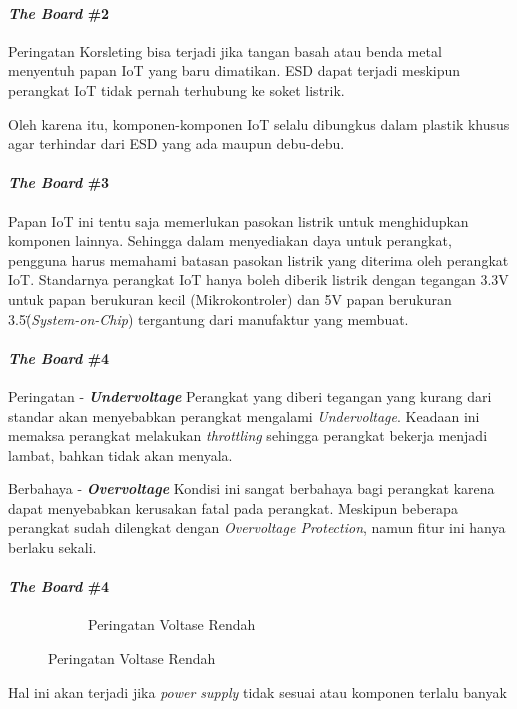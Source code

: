\begin{frame}{\insertsectionhead}
	\framesubtitle{\textit{The Board} \#2}
	\justifying
	\begin{block}{Peringatan}
		Korsleting bisa terjadi jika tangan basah atau benda metal menyentuh papan IoT yang baru dimatikan. ESD dapat terjadi meskipun perangkat IoT tidak pernah terhubung ke soket listrik.
	\end{block}
	\vfill
	Oleh karena itu, komponen-komponen IoT selalu dibungkus dalam plastik khusus agar terhindar dari ESD yang ada maupun debu-debu.
\end{frame}

\begin{frame}{\insertsectionhead}
	\framesubtitle{\textit{The Board} \#3}
	\justifying
	Papan IoT ini tentu saja memerlukan pasokan listrik untuk menghidupkan komponen lainnya. Sehingga dalam menyediakan daya untuk perangkat, pengguna harus memahami batasan pasokan listrik yang diterima oleh perangkat IoT.
	\vfill
	Standarnya perangkat IoT hanya boleh diberik listrik dengan tegangan 3.3V untuk papan berukuran kecil (Mikrokontroler) dan 5V papan berukuran 3.5\" (\textit{System-on-Chip}) tergantung dari manufaktur yang membuat.
\end{frame}

\begin{frame}{\insertsectionhead}
	\framesubtitle{\textit{The Board} \#4}
	\justifying
	\begin{block}{Peringatan - \textbf{\textit{Undervoltage}}}
		Perangkat yang diberi tegangan yang kurang dari standar akan menyebabkan perangkat mengalami \textit{Undervoltage}. Keadaan ini memaksa perangkat melakukan \textit{throttling} sehingga perangkat bekerja menjadi lambat, bahkan tidak akan menyala.
	\end{block}
	\vfill
	\begin{block}{Berbahaya - \textbf{\textit{Overvoltage}}}
		Kondisi ini sangat berbahaya bagi perangkat karena dapat menyebabkan kerusakan fatal pada perangkat. Meskipun beberapa perangkat sudah dilengkat dengan \textit{Overvoltage Protection}, namun fitur ini hanya berlaku sekali.
	\end{block}
\end{frame}

\begin{frame}{\insertsectionhead}
	\framesubtitle{\textit{The Board} \#4}
	\justifying
	\begin{figure}[ht!]
		\begin{subfigure}[b]{0.9\textwidth}
			\caption*{Peringatan Voltase Rendah}
		\end{subfigure}
	\end{figure}
	\vfill
	Hal ini akan terjadi jika \textit{power supply} tidak sesuai atau komponen terlalu banyak
\end{frame}

